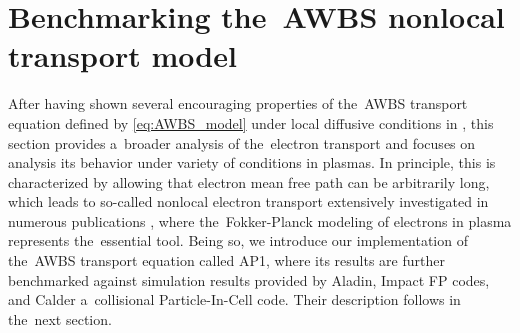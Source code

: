 \section{Benchmarking the~AWBS nonlocal transport model}
\label{sec:BenchmarkingAWBS}
After having shown several encouraging properties of the~AWBS transport 
equation defined by \eqref{eq:AWBS_model} under local diffusive conditions
in , this section provides a~broader analysis
of the~electron transport and focuses on analysis its behavior under variety of
conditions in plasmas. In principle, this is characterized by allowing that
electron mean free path can be arbitrarily long, which leads to so-called 
nonlocal electron transport extensively investigated in numerous publications 
\cite{Malone_1975_15, Colombant_PoP2005, Bell_1981_83, LMV_1983_7, Brantov_Nonlocal_electron_transport_1998, schurtz2000, Sorbo_2015}, where the~Fokker-Planck
modeling of electrons in plasma represents the~essential tool. Being so, 
we introduce our implementation of the~AWBS transport equation called AP1,
where its results are further benchmarked against simulation results
provided by Aladin, Impact FP codes, and Calder a~collisional Particle-In-Cell
code. Their description follows in the~next section.

